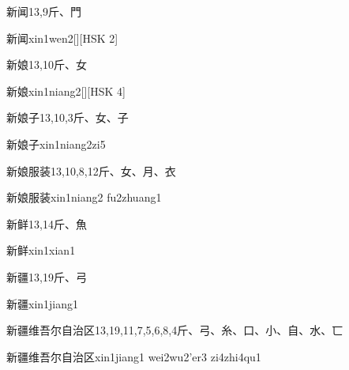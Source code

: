 \begin{entry}{新闻}{13,9}{⽄、⾨}
  \begin{phonetics}{新闻}{xin1wen2}[][HSK 2]
  \end{phonetics}
\end{entry}

\begin{entry}{新娘}{13,10}{⽄、⼥}
  \begin{phonetics}{新娘}{xin1niang2}[][HSK 4]
  \end{phonetics}
\end{entry}

\begin{entry}{新娘子}{13,10,3}{⽄、⼥、⼦}
  \begin{phonetics}{新娘子}{xin1niang2zi5}
  \end{phonetics}
\end{entry}

\begin{entry}{新娘服装}{13,10,8,12}{⽄、⼥、⽉、⾐}
  \begin{phonetics}{新娘服装}{xin1niang2 fu2zhuang1}
  \end{phonetics}
\end{entry}

\begin{entry}{新鲜}{13,14}{⽄、⿂}
  \begin{phonetics}{新鲜}{xin1xian1}
  \end{phonetics}
\end{entry}

\begin{entry}{新疆}{13,19}{⽄、⼸}
  \begin{phonetics}{新疆}{xin1jiang1}
  \end{phonetics}
\end{entry}

\begin{entry}{新疆维吾尔自治区}{13,19,11,7,5,6,8,4}{⽄、⼸、⽷、⼝、⼩、⾃、⽔、⼖}
  \begin{phonetics}{新疆维吾尔自治区}{xin1jiang1 wei2wu2'er3 zi4zhi4qu1}
  \end{phonetics}
\end{entry}


